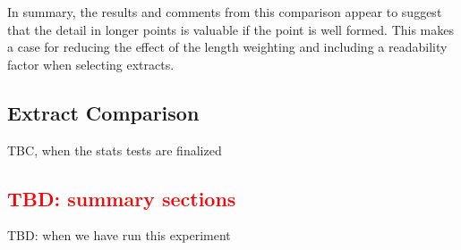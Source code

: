       In summary, the results and comments from this comparison appear to suggest that the detail in longer points is valuable if the point is well formed. This makes a case for reducing the effect of the length weighting and including a readability factor when selecting extracts.

    \tocless\subsection{Extract Comparison}
      TBC, when the stats tests are finalized
    \tocless\subsection{\textcolor{red}{TBD: summary sections}}
      TBD: when we have run this experiment
